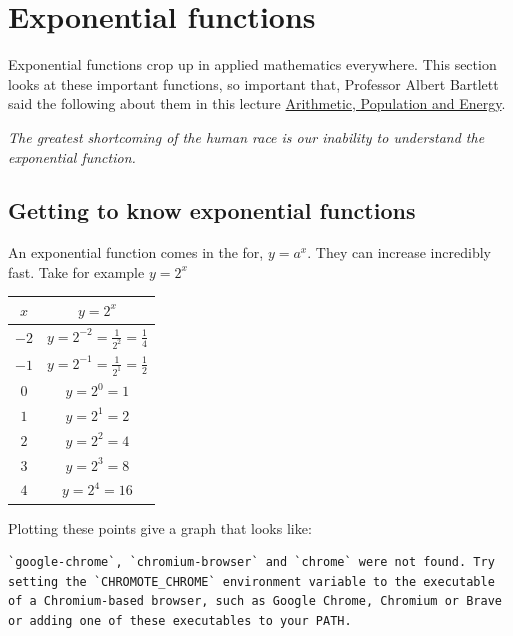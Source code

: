 \documentclass[
  a4paper,
]{scrbook}
\newcounter{none} %
\begin{document}

\chapter{Exponential functions}\label{exponential-functions}

Exponential functions crop up in applied mathematics everywhere. This
section looks at these important functions, so important that, Professor
Albert Bartlett said the following about them in this lecture
\href{https://www.youtube.com/watch?v=sI1C9DyIi_8}{Arithmetic,
Population and Energy}.

\emph{The greatest shortcoming of the human race is our inability to
understand the exponential function.}

\section{Getting to know exponential
functions}\label{getting-to-know-exponential-functions}

An exponential function comes in the for, \(y=a^x\). They can increase
incredibly fast. Take for example \(y=2^x\)

{\def\LTcaptype{none} %
\begin{longtable}[]{@{}cc@{}}
\toprule\noalign{}
\(x\) & \(y=2^x\) \\
\midrule\noalign{}
\endhead
\bottomrule\noalign{}
\endlastfoot
\(-2\) & \(y = 2^{-2} = \frac{1}{2^2} = \frac{1}{4}\) \\
\(-1\) & \(y = 2^{-1} = \frac{1}{2^1} = \frac{1}{2}\) \\
\(0\) & \(y = 2^{0} = 1\) \\
\(1\) & \(y = 2^{1} = 2\) \\
\(2\) & \(y = 2^{2} = 4\) \\
\(3\) & \(y = 2^{3} = 8\) \\
\(4\) & \(y = 2^{4} = 16\) \\
\end{longtable}
}

Plotting these points give a graph that looks like:

\begin{verbatim}
`google-chrome`, `chromium-browser` and `chrome` were not found. Try setting the `CHROMOTE_CHROME` environment variable to the executable of a Chromium-based browser, such as Google Chrome, Chromium or Brave or adding one of these executables to your PATH.
\end{verbatim}
\end{document}
